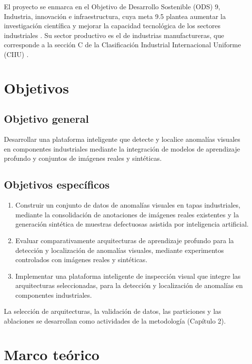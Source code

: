 \documentclass[12pt,oneside]{report}
\begin{document}
El proyecto se enmarca en el Objetivo de Desarrollo Sostenible (ODS) 9, Industria, innovación e infraestructura, cuya meta 9.5 plantea aumentar la investigación científica y mejorar la capacidad tecnológica de los sectores industriales \cite{un2015}. Su sector productivo es el de industrias manufactureras, que corresponde a la sección C de la Clasificación Industrial Internacional Uniforme (CIIU) \cite{un2008isic}.

\section{Objetivos}

\subsection{Objetivo general}

Desarrollar una plataforma inteligente que detecte y localice anomalías visuales en componentes industriales mediante la integración de modelos de aprendizaje profundo y conjuntos de imágenes reales y sintéticas.

\subsection{Objetivos específicos}

\begin{enumerate}[leftmargin=2cm]
  \item Construir un conjunto de datos de anomalías visuales en tapas industriales, mediante la consolidación de anotaciones de imágenes reales existentes y la generación sintética de muestras defectuosas asistida por inteligencia artificial.
  \item Evaluar comparativamente arquitecturas de aprendizaje profundo para la detección y localización de anomalías visuales, mediante experimentos controlados con imágenes reales y sintéticas.
  \item Implementar una plataforma inteligente de inspección visual que integre las arquitecturas seleccionadas, para la detección y localización de anomalías en componentes industriales.
\end{enumerate}

La selección de arquitecturas, la validación de datos, las particiones y las ablaciones se desarrollan como actividades de la metodología (Capítulo 2).

\section{Marco teórico}
\end{document}

